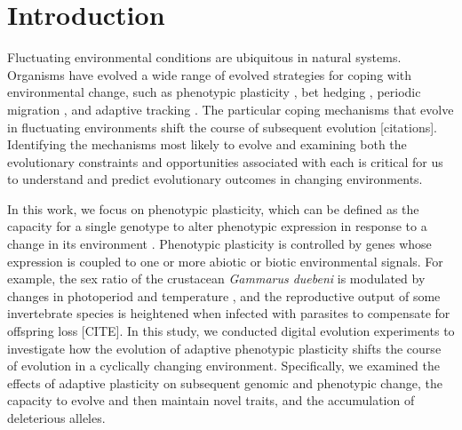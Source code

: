 
\section{Introduction}

Fluctuating environmental conditions are ubiquitous in natural systems. 
Organisms have evolved a wide range of evolved strategies for coping with environmental change, such as 
phenotypic plasticity \citep{ghalambor_adaptive_2007}, 
bet hedging \citep{simons_modes_2011}, 
periodic migration \citep{winger_long_2019}, 
and adaptive tracking \citep{barrett_adaptation_2008}.
The particular coping mechanisms that evolve in fluctuating environments shift the course of subsequent evolution [citations].
Identifying the mechanisms most likely to evolve and examining both the evolutionary constraints and opportunities associated with each is critical for us to understand and predict evolutionary outcomes in changing environments.

In this work, we focus on phenotypic plasticity, which can be defined as the capacity for a single genotype to alter phenotypic expression in response to a change in its environment \citep{west-eberhard_developmental_2003}. 
Phenotypic plasticity is controlled by genes whose expression is coupled to one or more abiotic or biotic environmental signals. 
For example, the sex ratio of the crustacean \textit{Gammarus duebeni} is modulated by changes in photoperiod and temperature \citep{dunn_two_2005}, and the reproductive output of some invertebrate species is heightened when infected with parasites to compensate for offspring loss [CITE]. 
In this study, we conducted digital evolution experiments to investigate how the evolution of adaptive phenotypic plasticity shifts the course of evolution in a cyclically changing environment.
Specifically, we examined the effects of adaptive plasticity on subsequent genomic and phenotypic change, the capacity to evolve and then maintain novel traits, and the accumulation of deleterious alleles.


